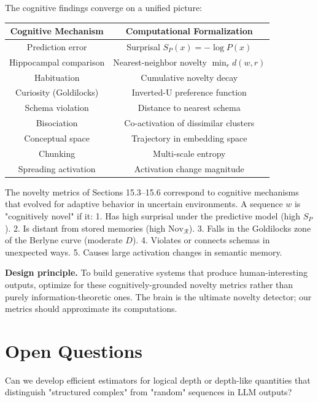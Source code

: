 The cognitive findings converge on a unified picture:

\begin{center}
\begin{tabular}{cc}
\toprule
Cognitive Mechanism & Computational Formalization \\
\midrule
Prediction error & Surprisal $S_P(x) = -\log P(x)$ \\
Hippocampal comparison & Nearest-neighbor novelty $\min_r d(w, r)$ \\
Habituation & Cumulative novelty decay \\
Curiosity (Goldilocks) & Inverted-U preference function \\
Schema violation & Distance to nearest schema \\
Bisociation & Co-activation of dissimilar clusters \\
Conceptual space & Trajectory in embedding space \\
Chunking & Multi-scale entropy \\
Spreading activation & Activation change magnitude \\
\bottomrule
\end{tabular}
\end{center}

\begin{theorem}[Informal]
The novelty metrics of Sections 15.3--15.6 correspond to cognitive mechanisms that evolved for adaptive behavior in uncertain environments. A sequence $w$ is "cognitively novel" if it:
1. Has high surprisal under the predictive model (high $S_P$).
2. Is distant from stored memories (high $\mathrm{Nov}_{\mathcal{R}}$).
3. Falls in the Goldilocks zone of the Berlyne curve (moderate $D$).
4. Violates or connects schemas in unexpected ways.
5. Causes large activation changes in semantic memory.

\textbf{Design principle.} To build generative systems that produce human-interesting outputs, optimize for these cognitively-grounded novelty metrics rather than purely information-theoretic ones. The brain is the ultimate novelty detector; our metrics should approximate its computations.
\end{theorem}



\section{Open Questions}

\begin{question}
Can we develop efficient estimators for logical depth or depth-like quantities that distinguish "structured complex" from "random" sequences in LLM outputs?
\end{question}

